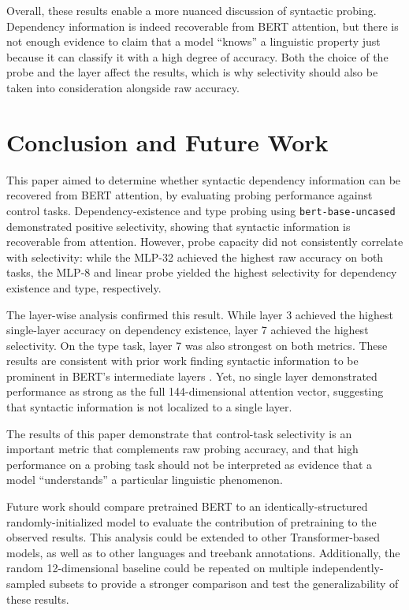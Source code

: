 \documentclass[12pt,a4paper]{article}
\begin{document}
Overall, these results enable a more nuanced discussion of syntactic probing. Dependency information is indeed recoverable from BERT attention, but there is not enough evidence to claim that a model ``knows'' a linguistic property just because it can classify it with a high degree of accuracy. Both the choice of the probe and the layer affect the results, which is why selectivity should also be taken into consideration alongside raw accuracy.



\section{Conclusion and Future Work}

This paper aimed to determine whether syntactic dependency information can be recovered from BERT attention, by evaluating probing performance against control tasks. Dependency-existence and type probing using \texttt{bert-base-uncased} demonstrated positive selectivity, showing that syntactic information is recoverable from attention. However, probe capacity did not consistently correlate with selectivity: while the MLP-32 achieved the highest raw accuracy on both tasks, the MLP-8 and linear probe yielded the highest selectivity for dependency existence and type, respectively.

The layer-wise analysis confirmed this result. While layer 3 achieved the highest single-layer accuracy on dependency existence, layer 7 achieved the highest selectivity. On the type task, layer 7 was also strongest on both metrics. These results are consistent with prior work finding syntactic information to be prominent in BERT's intermediate layers \cite{tenney2019bert}. Yet, no single layer demonstrated performance as strong as the full 144-dimensional attention vector, suggesting that syntactic information is not localized to a single layer.

The results of this paper demonstrate that control-task selectivity is an important metric that complements raw probing accuracy, and that high performance on a probing task should not be interpreted as evidence that a model ``understands'' a particular linguistic phenomenon.

Future work should compare pretrained BERT to an identically-structured randomly-initialized model to evaluate the contribution of pretraining to the observed results. This analysis could be extended to other Transformer-based models, as well as to other languages and treebank annotations. Additionally, the random 12-dimensional baseline could be repeated on multiple independently-sampled subsets to provide a stronger comparison and test the generalizability of these results.
\end{document}
